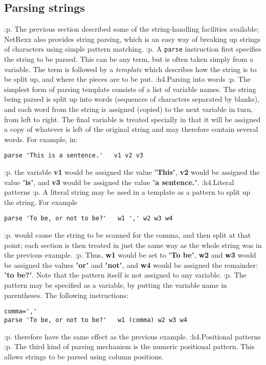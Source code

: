 \subsection{Parsing strings}\label{refoparse}
:p.
The previous section described some of the string-handling facilities
available; NetRexx also provides string parsing, which is an easy way of
breaking up strings of characters using simple pattern matching.
:p.
A \texttt{parse} instruction first specifies the string to be parsed.
This can be any term, but is often taken simply from a variable.  The
term is followed by a \emph{template} which describes how the string
is to be split up, and where the pieces are to be put.
:h4.Parsing into words
:p.
The simplest form of parsing template consists of a list of variable
names.  The string being parsed is split up into words (sequences of
characters separated by blanks), and each word from the string is
assigned (copied) to the next variable in turn, from left to right.  The
final variable is treated specially in that it will be assigned a copy
of whatever is left of the original string and may therefore contain
several words. For example, in:
\begin{verbatim}
parse 'This is a sentence.'   v1 v2 v3
\end{verbatim}
:p.
the variable \textbf{v1} would be assigned the value
"\textbf{This}", \textbf{v2} would be assigned the value
"\textbf{is}", and \textbf{v3} would be assigned the value
"\textbf{a sentence.}".
:h4.Literal patterns
:p.
A literal string may be used in a template as a pattern to split up the
string.  For example
\begin{verbatim}
parse 'To be, or not to be?'   w1 ',' w2 w3 w4
\end{verbatim}
:p.
would cause the string to be scanned for the comma, and then split at
that point; each section is then treated in just the same way as the
whole string was in the previous example.
:p.
Thus, \textbf{w1} would be set to
"\textbf{To be}", \textbf{w2} and \textbf{w3} would be
assigned the values "\textbf{or}" and "\textbf{not}",
and \textbf{w4} would be assigned the remainder: "\textbf{to
be?}".  Note that the pattern itself is not assigned to any
variable.
:p.
The pattern may be specified as a variable, by putting the variable name
in parentheses.  The following instructions:
\begin{verbatim}
comma=','
parse 'To be, or not to be?'   w1 (comma) w2 w3 w4
\end{verbatim}
:p.
therefore have the same effect as the previous example.
:h4.Positional patterns
:p.
The third kind of parsing mechanism is the numeric positional pattern.
This allows strings to be parsed using column positions.
